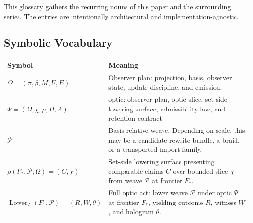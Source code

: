 \documentclass{aion}
\begin{document}
This glossary gathers the recurring nouns of this paper and the surrounding
series. The entries are intentionally architectural and implementation-agnostic.

\begingroup
\footnotesize
\setlength{\tabcolsep}{3.5pt}
\renewcommand{\arraystretch}{0.97}

\subsection{Symbolic Vocabulary}

\begin{center}
	\AIONTableStyleOn
	\begin{tabularx}{\textwidth}{@{}>{\raggedright\arraybackslash}p{}X@{}}
		\toprule
		\AIONTableHead
		Symbol                                                                                                                                          & Meaning                                                                                                                                                      \\
		\midrule
		\(\Omega = (\pi,\beta,M,U,E)\)                                                                                                                  & Observer plan: projection, basis, observer state, update discipline, and emission.                                                                           \\
		\(\Psi = (\Omega,\chi,\rho,\Pi,\Lambda)\)                                                                                                       & \WARP{} optic: observer plan, optic slice, set-side lowering surface, admissibility law, and retention contract.                                             \\
		\(\mathcal{P}\)                                                                                                                                 & Basis-relative weave. Depending on scale, this may be a candidate rewrite bundle, a braid, or a transported import family.                                   \\
		\(\rho(F_*, \mathcal{P}; \Omega) = (C,\chi)\)                                                                                                   & Set-side lowering surface presenting comparable claims \(C\) over bounded slice \(\chi\) from weave \(\mathcal{P}\) at frontier \(F_*\).                     \\
		\(\operatorname{Lower}_{\Psi}(F_*, \mathcal{P}) = (R,W,\theta)\)                                                                                & Full optic act: lower weave \(\mathcal{P}\) under optic \(\Psi\) at frontier \(F_*\), yielding outcome \(R\), witness \(W\), and hologram \(\theta\).        \\

\end{tabularx}
\end{center}
\end{document}
